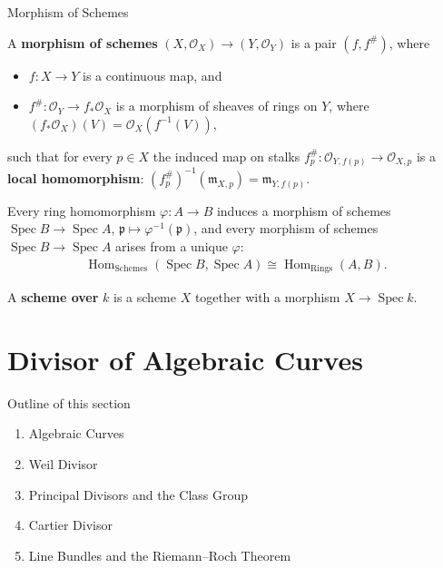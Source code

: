 \documentclass[10pt,aspectratio=1610]{beamer}
\DeclareMathOperator{\Spec}{Spec}
\DeclareMathOperator{\Hom}{Hom}
\newcommand{\OO}{\mathcal{O}}
\newcommand{\pp}{\mathfrak{p}}
\newcommand{\mm}{\mathfrak{m}}
\begin{document}
    \begin{frame}{Morphism of Schemes}
        \begin{definition}
            A \textbf{morphism of schemes} $(X, \OO_X) \to (Y, \OO_Y)$ is a pair $(f, f^\#)$, where
            \begin{itemize}
                \item $f \colon X \to Y$ is a continuous map, and
                \item $f^\# \colon \OO_Y \to f_*\OO_X$ is a morphism of sheaves of rings on $Y$, where $(f_*\OO_X)(V) = \OO_X(f^{-1}(V))$,
            \end{itemize}
            such that for every $p \in X$ the induced map on stalks $f^\#_p \colon \OO_{Y, f(p)} \to \OO_{X,p}$ is a \textbf{local homomorphism}: $(f^\#_p)^{-1}(\mm_{X,p}) = \mm_{Y,f(p)}$.
        \end{definition}
        \begin{theorem}
            Every ring homomorphism $\varphi \colon A \to B$ induces a morphism of schemes $\Spec B \to \Spec A$, $\pp \mapsto \varphi^{-1}(\pp)$, and every morphism of schemes $\Spec B \to \Spec A$ arises from a unique $\varphi$:
            \begin{align*}
                \Hom_{\text{Schemes}}(\Spec B, \Spec A) \cong \Hom_{\text{Rings}}(A, B).
            \end{align*}
        \end{theorem}
        A \textbf{scheme over} $k$ is a scheme $X$ together with a morphism $X \to \Spec k$.
    \end{frame}

    \section{Divisor of Algebraic Curves}

    \begin{frame}{Outline of this section}
        \begin{enumerate}
            \item Algebraic Curves
            \item Weil Divisor
            \item Principal Divisors and the Class Group
            \item Cartier Divisor
            \item Line Bundles and the Riemann--Roch Theorem
        \end{enumerate}
    \end{frame}
\end{document}
